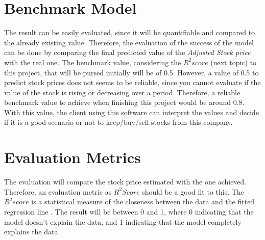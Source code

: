 \documentclass[a4paper, 11pt]{article}
\begin{document}
\section*{Benchmark Model}
The result can be easily evaluated, since it will be quantifiable and compared to the already existing value. Therefore, the evaluation of the success of the model can be done by comparing the final
predicted value of the \emph{Adjusted Stock price} with the real one. The benchmark value, considering the $R^2 score$ (next topic) to this project, that will be pursed initially will be of 0.5.
However, a value of 0.5 to predict stock prices does not seems to be reliable, since you cannot evaluate if the value of the stock is rising or decreasing over a period. 
Therefore, a reliable benchmark value to achieve when finishing this project would be around 0.8. With this value, the client using this software can interpret the values and decide if it is
a good scenario or not to keep/buy/sell stocks from this company.
\\

\section*{Evaluation Metrics}
The evaluation will compare the stock price estimated with the one achieved. Therefore, an evaluation metric as $R^2 Score$ should be a good fit to this. 
The $R^2 score$ is a statistical measure of the closeness between the data and the fitted regression line \cite{R2}. The result will be between 0 and 1, where 0 indicating that the model doesn't explain 
the data, and 1 indicating that the model completely explains the data.\\
\end{document}
